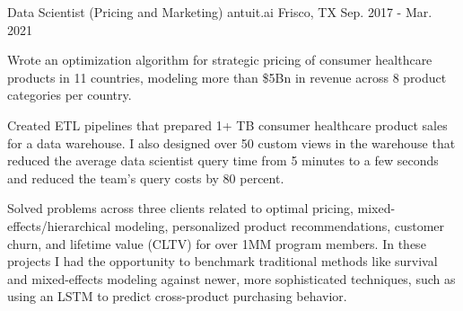 \begin{cventries}
  \cventry
    {Data Scientist (Pricing and Marketing)} %
    {antuit.ai} %
    {Frisco, TX} %
    {Sep. 2017 - Mar. 2021} %
    {
      \begin{cvitems} %
      \item {
          Wrote an optimization algorithm for strategic pricing of consumer
          healthcare products in 11 countries, modeling more than \$5Bn in
          revenue across 8 product categories per country.
      }
      \item {
          Created ETL pipelines that prepared 1+ TB consumer healthcare
          product sales for a data warehouse.   I also designed over 50 custom
          views in the warehouse that reduced the average data scientist query
          time from 5 minutes to a few seconds and reduced the team's query
          costs by 80 percent.
      }
      \item {
          Solved problems across three clients
          related to optimal pricing, mixed-effects/hierarchical modeling,
          personalized product recommendations, customer
          churn, and lifetime value (CLTV) for over 1MM program members.  In
          these projects I had the opportunity to benchmark traditional methods
          like survival and mixed-effects modeling against newer, more
          sophisticated techniques, such as using an LSTM to predict
          cross-product purchasing behavior.
      }
      \end{cvitems}
    }

\end{cventries}
